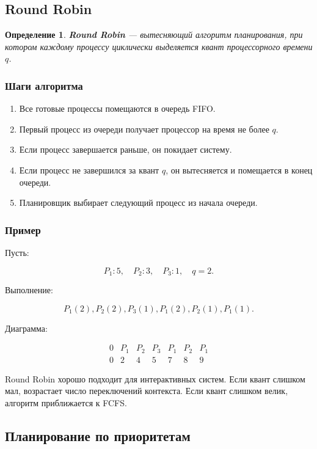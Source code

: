 \documentclass[12pt,a4paper]{article}
\newtheorem{definition}{Определение}
\begin{document}
\subsection{Round Robin}

\begin{definition}
\textbf{Round Robin} --- вытесняющий алгоритм планирования, при котором каждому процессу циклически выделяется квант процессорного времени $q$.
\end{definition}

\subsubsection*{Шаги алгоритма}

\begin{enumerate}
    \item Все готовые процессы помещаются в очередь FIFO.
    \item Первый процесс из очереди получает процессор на время не более $q$.
    \item Если процесс завершается раньше, он покидает систему.
    \item Если процесс не завершился за квант $q$, он вытесняется и помещается в конец очереди.
    \item Планировщик выбирает следующий процесс из начала очереди.
\end{enumerate}

\subsubsection*{Пример}

Пусть:

\[
P_1: 5,\quad P_2: 3,\quad P_3: 1,\quad q = 2.
\]

Выполнение:

\[
P_1(2), P_2(2), P_3(1), P_1(2), P_2(1), P_1(1).
\]

Диаграмма:

\[
\begin{array}{c|c|c|c|c|c|c}
0 & P_1 & P_2 & P_3 & P_1 & P_2 & P_1 \\
\hline
0 & 2 & 4 & 5 & 7 & 8 & 9
\end{array}
\]

Round Robin хорошо подходит для интерактивных систем. Если квант слишком мал, возрастает число переключений контекста. Если квант слишком велик, алгоритм приближается к FCFS.

\subsection{Планирование по приоритетам}
\end{document}
